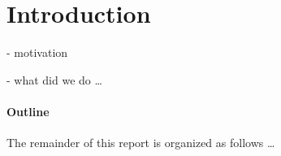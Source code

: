 \section{Introduction}
- motivation

- what did we do \ldots

\paragraph{Outline}
The remainder of this report is organized as follows \ldots
